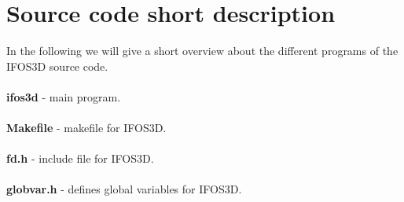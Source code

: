 \chapter{Source code short description}\label{sec:code_overview}
In the following we will give a short overview about the different programs of the IFOS3D source code.\\
\\
\textbf{ifos3d} - main program.\\
\\
\textbf{Makefile} - makefile for IFOS3D.\\
\\
\textbf{fd.h} - include file for IFOS3D. \\
\\
\textbf{globvar.h} - defines global variables for IFOS3D.\\

